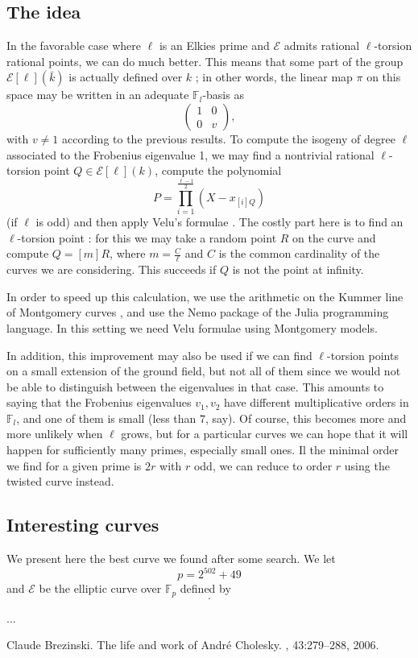\documentclass[12pt]{article}
\newcommand{\F}{\mathbb{F}}
\newcommand{\E}{\mathcal{E}}
\begin{document}
\subsection{The idea} In the favorable case where $\ell$ is an Elkies prime and $\E$ admits rational $\ell$-torsion rational points, we can do much better. This means that some part of the group $\E[\ell](\bar{k})$ is actually defined over $k$ ; in other words, the linear map $\pi$ on this space may be written in an adequate $\F_l$-basis as
$$\left(
\begin{matrix}
1 & 0 \\
0 & v
\end{matrix}
\right),$$
with $v\neq 1$ according to the previous results. To compute the isogeny of degree $\ell$ associated to the Frobenius eigenvalue 1, we may find a nontrivial rational $\ell$-torsion point $Q\in \E[\ell](k)$, compute the polynomial
$$ P = \prod_{i = 1}^{\frac{\ell - 1}{2}} (X - x_{[i] Q})$$
(if $\ell$ is odd) and then apply Velu's formulae \cite{Velu}. The costly part here is to find an $\ell$-torsion point : for this we may take a random point $R$ on the curve and compute $Q = [m]R$, where $m = \frac{C}{\ell}$ and $C$ is the common cardinality of the curves we are considering. This succeeds if $Q$ is not the point at infinity.

In order to speed up this calculation, we use the arithmetic on the Kummer line of Montgomery curves \cite{}, and use the Nemo package of the Julia programming language. In this setting we need  Velu formulae using Montgomery models.

In addition, this improvement may also be used if we can find $\ell$-torsion points on a small extension of the ground field, but not all of them since we would not be able to distinguish between the eigenvalues in that case. This amounts to saying that the Frobenius eigenvalues $v_1, v_2$ have different multiplicative orders in $\F_l$, and one of them is small (less than $7$, say). Of course, this becomes more and more unlikely when $\ell$ grows, but for a particular curves we can hope that it will happen for sufficiently many primes, especially small ones. Il the minimal order we find for a given prime is $2 r$ with $r$ odd, we can reduce to order $r$ using the twisted curve instead.

\subsection{Interesting curves}

We present here the best curve we found after some search. We let
$$ p = 2^{502} + 49$$
and $\E$ be the elliptic curve over $\F_p$ defined by
$$.$$

...


\begin{thebibliography}{99}

Claude Brezinski.
\newblock The life and work of {A}ndr\'e {C}holesky.
, 43:279--288, 2006.

\end{thebibliography}
\end{document}
